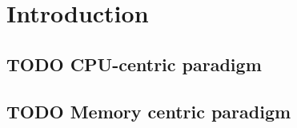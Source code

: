 \chapter{Introduction}

\section{TODO CPU-centric paradigm}

\section{TODO Memory centric paradigm}
